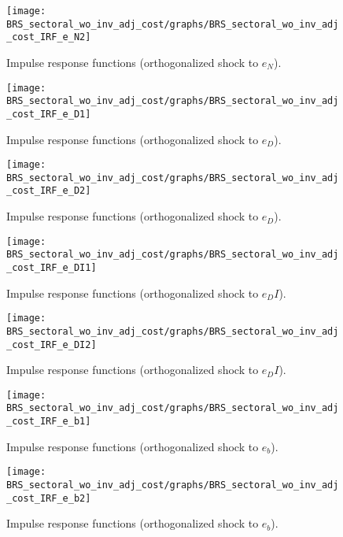 \begin{figure}[H]
\centering 
\texttt{[image: BRS\_sectoral\_wo\_inv\_adj\_cost/graphs/BRS\_sectoral\_wo\_inv\_adj\_cost\_IRF\_e\_N2]}
\caption{Impulse response functions (orthogonalized shock to ${e_N}$).}\label{Fig:IRF:e_N:2}
\end{figure}
 
\begin{figure}[H]
\centering 
\texttt{[image: BRS\_sectoral\_wo\_inv\_adj\_cost/graphs/BRS\_sectoral\_wo\_inv\_adj\_cost\_IRF\_e\_D1]}
\caption{Impulse response functions (orthogonalized shock to ${e_D}$).}\label{Fig:IRF:e_D:1}
\end{figure}
 
\begin{figure}[H]
\centering 
\texttt{[image: BRS\_sectoral\_wo\_inv\_adj\_cost/graphs/BRS\_sectoral\_wo\_inv\_adj\_cost\_IRF\_e\_D2]}
\caption{Impulse response functions (orthogonalized shock to ${e_D}$).}\label{Fig:IRF:e_D:2}
\end{figure}
 
\begin{figure}[H]
\centering 
\texttt{[image: BRS\_sectoral\_wo\_inv\_adj\_cost/graphs/BRS\_sectoral\_wo\_inv\_adj\_cost\_IRF\_e\_DI1]}
\caption{Impulse response functions (orthogonalized shock to ${e_DI}$).}\label{Fig:IRF:e_DI:1}
\end{figure}
 
\begin{figure}[H]
\centering 
\texttt{[image: BRS\_sectoral\_wo\_inv\_adj\_cost/graphs/BRS\_sectoral\_wo\_inv\_adj\_cost\_IRF\_e\_DI2]}
\caption{Impulse response functions (orthogonalized shock to ${e_DI}$).}\label{Fig:IRF:e_DI:2}
\end{figure}
 
\begin{figure}[H]
\centering 
\texttt{[image: BRS\_sectoral\_wo\_inv\_adj\_cost/graphs/BRS\_sectoral\_wo\_inv\_adj\_cost\_IRF\_e\_b1]}
\caption{Impulse response functions (orthogonalized shock to ${e_b}$).}\label{Fig:IRF:e_b:1}
\end{figure}
 
\begin{figure}[H]
\centering 
\texttt{[image: BRS\_sectoral\_wo\_inv\_adj\_cost/graphs/BRS\_sectoral\_wo\_inv\_adj\_cost\_IRF\_e\_b2]}
\caption{Impulse response functions (orthogonalized shock to ${e_b}$).}\label{Fig:IRF:e_b:2}
\end{figure}
 
